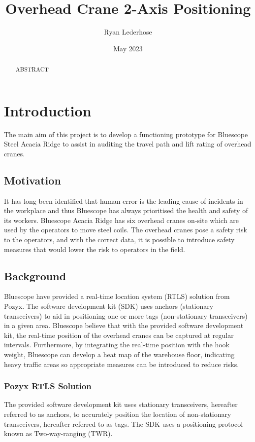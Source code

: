 \documentclass[12pt, a4paper]{article}
\title{Overhead Crane 2-Axis Positioning}
\author{Ryan Lederhose}
\date{May 2023}
\begin{document}
\maketitle

\newpage

\begin{abstract}
ABSTRACT
\end{abstract}

\newpage

\tableofcontents

\newpage

\section{Introduction}
The main aim of this project is to develop a functioning prototype for Bluescope Steel Acacia Ridge to assist in auditing the travel path and lift rating of overhead cranes. 
\subsection{Motivation}
It has long been identified that human error is the leading cause of incidents in the workplace and thus Bluescope has always prioritised the health and safety of its workers. Bluescope Acacia Ridge has six overhead cranes on-site which are used by the operators to move steel coils. The overhead cranes pose a safety risk to the operators, and with the correct data, it is possible to introduce safety measures that would lower the risk to operators in the field.
\subsection{Background}
Bluescope have provided a real-time location system (RTLS) solution from Pozyx. The software development kit (SDK) uses anchors (stationary transceivers) to aid in positioning one or more tags (non-stationary transceivers) in a given area. Bluescope believe that with the provided software development kit, the real-time position of the overhead cranes can be captured at regular intervals. Furthermore, by integrating the real-time position with the hook weight, Bluescope can develop a heat map of the warehouse floor, indicating heavy traffic areas so appropriate measures can be introduced to reduce risks.
\subsubsection{Pozyx RTLS Solution}
The provided software development kit uses stationary transceivers, hereafter referred to as anchors, to accurately position the location of non-stationary transceivers, hereafter referred to as tags. The SDK uses a positioning protocol known as Two-way-ranging (TWR).
\end{document}
